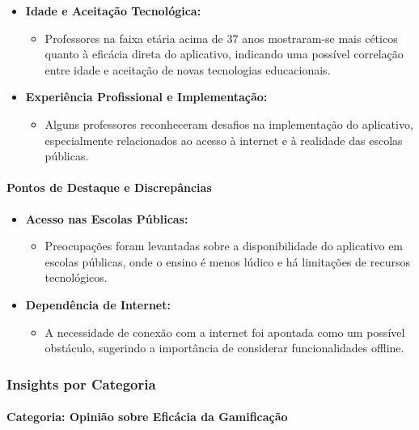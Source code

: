 \begin{itemize}
    \item \textbf{Idade e Aceitação Tecnológica:}
    \begin{itemize}
        \item Professores na faixa etária acima de 37 anos mostraram-se mais céticos quanto à eficácia direta do aplicativo, indicando uma possível correlação entre idade e aceitação de novas tecnologias educacionais.
    \end{itemize}
    \item \textbf{Experiência Profissional e Implementação:}
    \begin{itemize}
        \item Alguns professores reconheceram desafios na implementação do aplicativo, especialmente relacionados ao acesso à internet e à realidade das escolas públicas.
    \end{itemize}
\end{itemize}

\paragraph{Pontos de Destaque e Discrepâncias}

\begin{itemize}
    \item \textbf{Acesso nas Escolas Públicas:}
    \begin{itemize}
        \item Preocupações foram levantadas sobre a disponibilidade do aplicativo em escolas públicas, onde o ensino é menos lúdico e há limitações de recursos tecnológicos.
    \end{itemize}
    \item \textbf{Dependência de Internet:}
    \begin{itemize}
        \item A necessidade de conexão com a internet foi apontada como um possível obstáculo, sugerindo a importância de considerar funcionalidades offline.
    \end{itemize}
\end{itemize}

\subsubsection{Insights por Categoria}

\paragraph{Categoria: Opinião sobre Eficácia da Gamificação}

